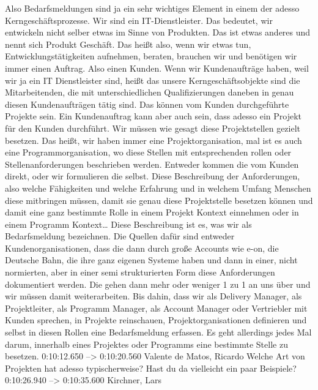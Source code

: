 Also Bedarfsmeldungen sind ja ein sehr wichtiges Element in einem der adesso Kerngeschäftsprozesse. Wir sind ein IT-Dienstleister. Das bedeutet, wir entwickeln nicht selber etwas im Sinne von Produkten. Das ist etwas anderes und nennt sich Produkt Geschäft. Das heißt also, wenn wir etwas tun, Entwicklungstätigkeiten aufnehmen, beraten, brauchen wir und benötigen wir immer einen Auftrag. Also einen Kunden. Wenn wir Kundenaufträge haben, weil wir ja ein IT Dienstleister sind, heißt das unsere Kerngeschäftsobjekte sind die Mitarbeitenden, die mit unterschiedlichen Qualifizierungen daneben in genau diesen Kundenaufträgen tätig sind. Das können vom Kunden durchgeführte Projekte sein. Ein Kundenauftrag kann aber auch sein, dass adesso ein Projekt für den Kunden durchführt. Wir müssen wie gesagt diese Projektstellen gezielt besetzen. Das heißt, wir haben immer eine Projektorganisation, mal ist es auch eine Programmorganisation, wo diese Stellen mit entsprechenden rollen oder Stellenanforderungen beschrieben werden. Entweder kommen die vom Kunden direkt, oder wir formulieren die selbst. Diese Beschreibung der Anforderungen, also welche Fähigkeiten und welche Erfahrung und in welchem Umfang Menschen diese mitbringen müssen, damit sie genau diese Projektstelle besetzen können und damit eine ganz bestimmte Rolle in einem Projekt Kontext einnehmen oder in einem Programm Kontext… Diese Beschreibung ist es, was wir als Bedarfsmeldung bezeichnen. Die Quellen dafür sind entweder Kundenorganisationen, dass die dann durch große Accounts wie e-on, die Deutsche Bahn, die ihre ganz eigenen Systeme haben und dann in einer, nicht normierten, aber in einer semi strukturierten Form diese Anforderungen dokumentiert werden. Die gehen dann mehr oder weniger 1 zu 1 an uns über und wir müssen damit weiterarbeiten. Bis dahin, dass wir als Delivery Manager, als Projektleiter, als Programm Manager, als Account Manager oder Vertriebler mit Kunden sprechen, in Projekte reinschauen, Projektorganisationen definieren und selbst in diesen Rollen eine Bedarfsmeldung erfassen. Es geht allerdings jedes Mal darum, innerhalb eines Projektes oder Programms eine bestimmte Stelle zu besetzen.
0:10:12.650 --> 0:10:20.560
Valente de Matos, Ricardo
Welche Art von Projekten hat adesso typischerweise? Hast du da vielleicht ein paar Beispiele?
0:10:26.940 --> 0:10:35.600
Kirchner, Lars
